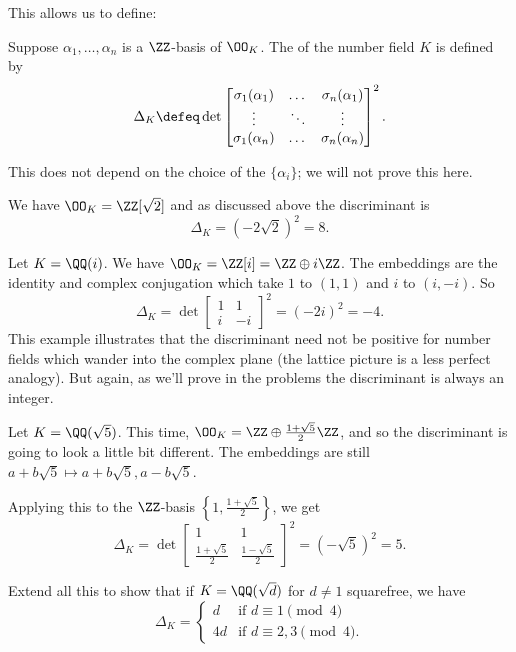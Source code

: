 This allows us to define:
\begin{definition}
	Suppose $\alpha_1, \dots, \alpha_n$ is a $\ZZ$-basis of $\OO_K$.
	The  of the number field $K$ is defined by
	\[
	\Delta_K \defeq \det
	\begin{bmatrix}
		\sigma_1(\alpha_1) & \dots & \sigma_n(\alpha_1) \\
		\vdots & \ddots & \vdots \\
		\sigma_1(\alpha_n) & \dots & \sigma_n(\alpha_n) \\
	\end{bmatrix}^2.
	\]
\end{definition}
This does not depend on the choice of the $\{\alpha_i\}$;
we will not prove this here.
\begin{example}[Discriminant of $K = \QQ(\sqrt2)$]
	We have $\OO_K = \ZZ[\sqrt 2]$
	and as discussed above the discriminant is
	\[
		\Delta_K =
		(-2 \sqrt 2)^2 = 8.
	\]
\end{example}
\begin{example}[Discriminant of $\QQ(i)$]
	Let $K = \QQ(i)$.
	We have $\OO_K = \ZZ[i] = \ZZ \oplus i \ZZ$.
	The embeddings are the identity and complex conjugation
	which take $1$ to $(1,1)$ and $i$ to $(i, -i)$.
	So
	\[
		\Delta_K =
		\det
		\begin{bmatrix}
			1 & 1 \\
			i & -i
		\end{bmatrix}^2
		=
		(-2i)^2 = -4.
	\]
	This example illustrates that the discriminant need not be positive
	for number fields which wander into the complex plane
	(the lattice picture is a less perfect analogy).
	But again, as we'll prove in the problems the discriminant is always
	an integer.
\end{example}
\begin{example}
	Let $K = \QQ(\sqrt5)$.
	This time, $\OO_K = \ZZ \oplus \frac{1+\sqrt5}{2} \ZZ$, and so the discriminant
	is going to look a little bit different.
	The embeddings are still $a+b\sqrt 5 \mapsto a+b\sqrt5, a-b\sqrt5$.

	Applying this to the $\ZZ$-basis $\left\{ 1, \frac{1+\sqrt5}{2} \right\}$, we get
	\[
		\Delta_K
		=
		\det
		\begin{bmatrix}
			1 & 1 \\
			\frac{1+\sqrt5}{2} & \frac{1-\sqrt5}{2}
		\end{bmatrix}^2
		= (-\sqrt 5)^2 = 5.
	\]
\end{example}
\begin{exercise}
	Extend all this to show that
	if $K = \QQ(\sqrt d)$ for $d \neq 1$ squarefree, we have
	\[
		\Delta_K =
		\begin{cases}
			d & \text{if } d \equiv 1 \pmod 4 \\
			4d & \text{if } d \equiv 2, 3 \pmod 4.
		\end{cases}
	\]
\end{exercise}

